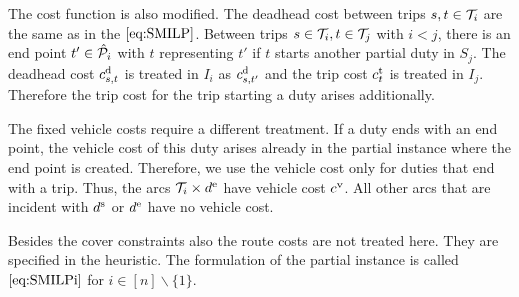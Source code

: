The cost function is also modified. The deadhead cost between trips ${s,t\in\mathcal{T}_i}$ are the same as in the $\eqref{eq:SMILP}$. Between trips ${s\in\mathcal{T}_i}, {t\in\mathcal{T}_j}$ with ${i<j}$, there is an end point ${t'\in\hat{\mathcal{P}}_i}$ with $t$ representing $t'$ if $t$ starts another partial duty in $S_j$. The deadhead cost $c^{\operatorname{d}}_{s,t}$ is treated in $I_i$ as $c^{\operatorname{d}}_{s,t'}$ and the trip cost $c^{\operatorname{t}}_t$ is treated in $I_j$. Therefore the trip cost for the trip starting a duty arises additionally.

The fixed vehicle costs require a different treatment. If a duty ends with an end point, the vehicle cost of this duty arises already in the partial instance where the end point is created. Therefore, we use the vehicle cost only for duties that end with a trip. Thus, the arcs ${\mathcal{T}_i\times d^{\operatorname{e}}}$ have vehicle cost $c^{\operatorname{v}}$. All other arcs that are incident with $d^{\operatorname{s}}$ or $d^{\operatorname{e}}$ have no vehicle cost.

Besides the cover constraints also the route costs are not treated here. They are specified in the heuristic. The formulation of the partial instance is called $\eqref{eq:SMILPi}$ for ${i\in[n]\backslash\{1\}}$.

